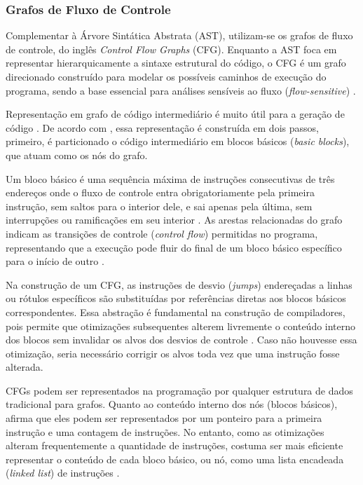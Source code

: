 \documentclass[
    12pt,                %
    openright,           %
    oneside,             %
    a4paper,             %
    english,             %
    brazil               %
]{abntex2}
\begin{document}
\begin{itemize}
\subsubsection{Grafos de Fluxo de Controle}
\label{sec:gfc}
\par
Complementar à Árvore Sintática Abstrata (AST), utilizam-se os grafos de fluxo de controle, do inglês \textit{Control Flow Graphs} (CFG).
Enquanto a AST foca em representar hierarquicamente a sintaxe estrutural do código, o CFG é um grafo direcionado construído para modelar os possíveis caminhos de execução do programa, sendo a base essencial para análises sensíveis ao fluxo (\textit{flow-sensitive}) \cite{aho2007compilers}.
\par
Representação em grafo de código intermediário é muito útil para a geração de código \cite{aho2007compilers}.
De acordo com , essa representação é construída em dois passos, primeiro, é particionado o código intermediário em blocos básicos (\textit{basic blocks}), que atuam como os nós do grafo.
\par
Um bloco básico é uma sequência máxima de instruções consecutivas de três endereços onde o fluxo de controle entra obrigatoriamente pela primeira instrução, sem saltos para o interior dele, e sai apenas pela última, sem interrupções ou ramificações em seu interior \cite{aho2007compilers}.
As arestas relacionadas do grafo indicam as transições de controle (\textit{control flow}) permitidas no programa, representando que a execução pode fluir do final de um bloco básico específico para o início de outro \cite{aho2007compilers}.
\par
Na construção de um CFG, as instruções de desvio (\textit{jumps}) endereçadas a linhas ou rótulos específicos são substituídas por referências diretas aos blocos básicos correspondentes.
Essa abstração é fundamental na construção de compiladores, pois permite que otimizações subsequentes alterem livremente o conteúdo interno dos blocos sem invalidar os alvos dos desvios de controle \cite{aho2007compilers}.
Caso não houvesse essa otimização, seria necessário corrigir os alvos toda vez que uma instrução fosse alterada.
\par
CFGs podem ser representados na programação por qualquer estrutura de dados tradicional para grafos. 
Quanto ao conteúdo interno dos nós (blocos básicos),  afirma que eles podem ser representados por um ponteiro para a primeira instrução e uma contagem de instruções.
No entanto, como as otimizações alteram frequentemente a quantidade de instruções, costuma ser mais eficiente representar o conteúdo de cada bloco básico, ou nó, como uma lista encadeada (\textit{linked list}) de instruções \cite{aho2007compilers}.


\end{itemize}
\end{document}

